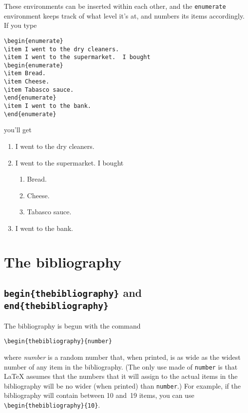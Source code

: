 These environments can be inserted within each other, and the
\verb"enumerate" environment keeps track of what level it's at, and
numbers its items accordingly.  If you type
\begin{verbatim}
\begin{enumerate}
\item I went to the dry cleaners.
\item I went to the supermarket.  I bought
\begin{enumerate}
\item Bread.
\item Cheese.
\item Tabasco sauce.
\end{enumerate}
\item I went to the bank.
\end{enumerate}
\end{verbatim}
%
you'll get
%
\begin{enumerate}
\item I went to the dry cleaners.
\item I went to the supermarket.  I bought
\begin{enumerate}
\item Bread.
\item Cheese.
\item Tabasco sauce.
\end{enumerate}
\item I went to the bank.
\end{enumerate}








\section{The bibliography}
\label{sec:bibliography}

\subsection{{\tt begin\{thebibliography\}} and {\tt
end\{thebibliography\}}}


The bibliography is begun with the command
\begin{center}
\verb"\begin{thebibliography}{number}"
\end{center}
where {\em number\/} is a random number that, when printed, is as
wide as the widest number of any item in the bibliography.  (The only
use made of \verb"number" is that \LaTeX{} assumes that the numbers
that it will assign to the actual items in the bibliography will be
no wider (when printed) than \verb"number".) For example, if the
bibliography will contain between 10 and~19 items, you can use
\verb"\begin{thebibliography}{10}".

